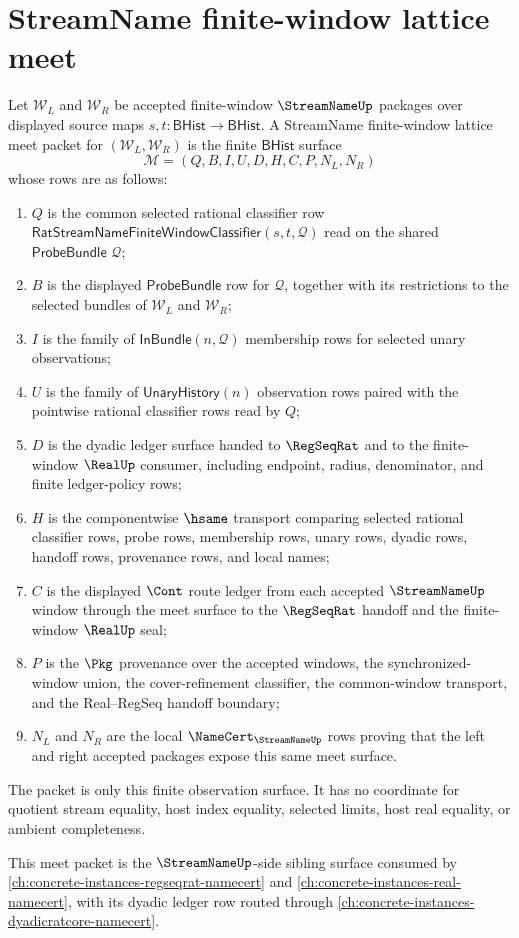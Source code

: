 \section{StreamName finite-window lattice meet}
\label{sec:streamname-finite-window-lattice-meet}

\begin{definition}
\label{def:streamname-finite-window-lattice-meet}
Let $\mathcal W_L$ and $\mathcal W_R$ be accepted finite-window
$\StreamNameUp$ packages over displayed source maps $s,t:\mathsf{BHist}\to
\mathsf{BHist}$. A StreamName finite-window lattice meet packet for
$(\mathcal W_L,\mathcal W_R)$ is the finite $\mathsf{BHist}$ surface
$$
\mathcal M=(Q,B,I,U,D,H,C,P,N_L,N_R)
$$
whose rows are as follows:
\begin{enumerate}
\item $Q$ is the common selected rational classifier row
$\mathsf{RatStreamNameFiniteWindowClassifier}(s,t,\mathcal Q)$ read on the
shared $\mathsf{ProbeBundle}$ $\mathcal Q$;
\item $B$ is the displayed $\mathsf{ProbeBundle}$ row for $\mathcal Q$,
together with its restrictions to the selected bundles of $\mathcal W_L$ and
$\mathcal W_R$;
\item $I$ is the family of $\mathsf{InBundle}(n,\mathcal Q)$ membership rows
for selected unary observations;
\item $U$ is the family of $\mathsf{UnaryHistory}(n)$ observation rows paired
with the pointwise rational classifier rows read by $Q$;
\item $D$ is the dyadic ledger surface handed to $\RegSeqRat$ and to the
finite-window $\RealUp$ consumer, including endpoint, radius, denominator,
and finite ledger-policy rows;
\item $H$ is the componentwise $\hsame$ transport comparing selected rational
classifier rows, probe rows, membership rows, unary rows, dyadic rows,
handoff rows, provenance rows, and local names;
\item $C$ is the displayed $\Cont$ route ledger from each accepted
$\StreamNameUp$ window through the meet surface to the $\RegSeqRat$ handoff
and the finite-window $\RealUp$ seal;
\item $P$ is the $\Pkg$ provenance over the accepted windows, the
synchronized-window union, the cover-refinement classifier, the common-window
transport, and the Real--RegSeq handoff boundary;
\item $N_L$ and $N_R$ are the local $\NameCert_{\StreamNameUp}$ rows proving
that the left and right accepted packages expose this same meet surface.
\end{enumerate}
The packet is only this finite observation surface. It has no coordinate for
quotient stream equality, host index equality, selected limits, host real
equality, or ambient completeness.

This meet packet is the $\StreamNameUp$-side sibling surface consumed by
\autoref{ch:concrete-instances-regseqrat-namecert} and
\autoref{ch:concrete-instances-real-namecert}, with its dyadic ledger row
routed through \autoref{ch:concrete-instances-dyadicratcore-namecert}.
\end{definition}

